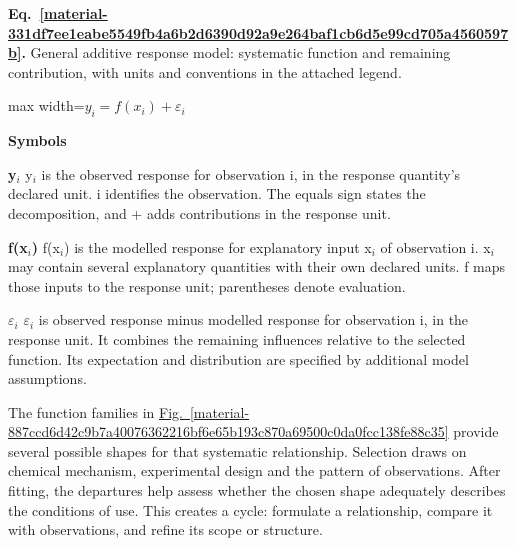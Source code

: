 \documentclass[11pt,a4paper]{article}
\begin{document}
\par\medskip
\begin{samepage}
\label{material-331df7ee1eabe5549fb4a6b2d6390d92a9e264baf1cb6d5e99cd705a4560597b}
\noindent\textbf{Eq.~\ref*{material-331df7ee1eabe5549fb4a6b2d6390d92a9e264baf1cb6d5e99cd705a4560597b}.} General additive response model: systematic function and remaining contribution, with units and conventions in the attached legend.\par\nopagebreak
\begin{center}\begin{adjustbox}{max width=\linewidth}$\displaystyle y_i = f(x_i) + \varepsilon_i$\end{adjustbox}\end{center}

\par\noindent\textbf{Symbols}

\par\noindent\textbf{y\ensuremath{{}_i}} y\ensuremath{{}_i} is the observed response for observation i, in the response quantity's declared unit. i identifies the observation. The equals sign states the decomposition, and + adds contributions in the response unit.

\par\noindent\textbf{f(x\ensuremath{{}_i})} f(x\ensuremath{{}_i}) is the modelled response for explanatory input x\ensuremath{{}_i} of observation i. x\ensuremath{{}_i} may contain several explanatory quantities with their own declared units. f maps those inputs to the response unit; parentheses denote evaluation.

\par\noindent\textbf{\ensuremath{\varepsilon}\ensuremath{{}_i}} \ensuremath{\varepsilon}\ensuremath{{}_i} is observed response minus modelled response for observation i, in the response unit. It combines the remaining influences relative to the selected function. Its expectation and distribution are specified by additional model assumptions.

\end{samepage}
\medskip

The function families in \hyperref[material-887ccd6d42c9b7a40076362216bf6e65b193c870a69500c0da0fcc138fe88c35]{Fig.~\ref*{material-887ccd6d42c9b7a40076362216bf6e65b193c870a69500c0da0fcc138fe88c35}} provide several possible shapes for that systematic relationship. Selection draws on chemical mechanism, experimental design and the pattern of observations. After fitting, the departures help assess whether the chosen shape adequately describes the conditions of use. This creates a cycle: formulate a relationship, compare it with observations, and refine its scope or structure.
\end{document}
